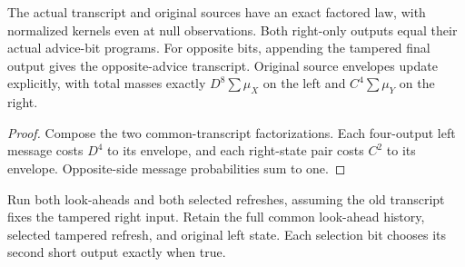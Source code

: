 \begin{theorem}
  \label{thm:lowerbounds-algebraic-flipflop-transcript}
  \leanok
  The actual transcript and original sources have an exact factored law,
  with normalized kernels even at null observations. Both right-only
  outputs equal their actual advice-bit programs. For opposite bits,
  appending the tampered final output gives the opposite-advice transcript.
  Original source envelopes update explicitly, with total masses exactly
  $D^8\sum\mu_X$ on the left and $C^4\sum\mu_Y$ on the right.
\end{theorem}
\begin{proof}
  \leanok
  Compose the two common-transcript factorizations. Each four-output left
  message costs $D^4$ to its envelope, and each right-state pair costs
  $C^2$ to its envelope. Opposite-side message probabilities sum to one.
\end{proof}

\begin{definition}
  \label{def:lowerbounds-algebraic-flipflop-preservation-half}
  \leanok
  Run both look-aheads and both selected refreshes, assuming the old
  transcript fixes the tampered right input. Retain the full common
  look-ahead history, selected tampered refresh, and original left state.
  Each selection bit chooses its second short output exactly when true.
\end{definition}

